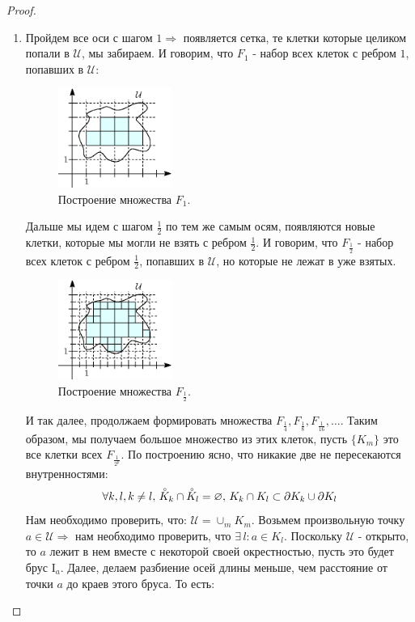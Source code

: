 \documentclass[12pt]{article}
\newcommand{\MI}{\mathrm{I}}
\newcommand{\MU}{\mathcal{U}}
\newcommand{\VN}{\varnothing}
\theoremstyle{definition}
\newcommand{\Circ}[1]{\accentset{\circ}{#1}}
\begin{document}
\begin{proof}\hfill
	\begin{enumerate}[label=\arabic*)]
		\item Пройдем все оси с шагом $1\Rightarrow$ появляется сетка, те клетки которые целиком попали в $\MU$, мы забираем. И говорим, что $F_1$ - набор всех клеток с ребром $1$, попавших в $\MU$:
		\begin{figure}[H]
			\centering
			\includegraphics[width=0.35\textwidth]{MA4L5_5.eps}
			\caption{Построение множества $F_1$.}
			\label{5_5}
		\end{figure}
		Дальше мы идем с шагом $\tfrac{1}{2}$ по тем же самым осям, появляются новые клетки, которые мы могли не взять с ребром $\tfrac{1}{2}$. И говорим, что $F_{\frac{1}{2}}$ - набор всех клеток с ребром $\tfrac{1}{2}$, попавших в $\MU$, но которые не лежат в уже взятых.
		\begin{figure}[H]
			\centering
			\includegraphics[width=0.35\textwidth]{MA4L5_6.eps}
			\caption{Построение множества $F_{\frac{1}{2}}$.}
			\label{5_6}
		\end{figure}
		И так далее, продолжаем формировать множества $F_{\frac{1}{4}}, F_{\frac{1}{8}}, F_{\frac{1}{16}}, \dotsc$. Таким образом, мы получаем большое множество из этих клеток, пусть $\{K_m\}$ это все клетки всех $F_{\frac{1}{2^p}}$. По построению ясно, что никакие две не пересекаются внутренностями:
		$$
			\forall k,l, k \neq l,\,  \Circ{K}_k \cap \Circ{K}_l = \VN, \, K_k \cap K_l \subset \partial K_k \cup \partial K_l 
		$$
		Нам необходимо проверить, что: $\MU = \cup_m K_m$. Возьмем произвольную точку $a \in \MU \Rightarrow$ нам необходимо проверить, что $\exists \, l \colon a \in K_l$. Поскольку $\MU$ - открыто, то $a$ лежит в нем вместе с некоторой своей окрестностью, пусть это будет брус $\MI_a$. Далее, делаем разбиение осей длины меньше, чем расстояние от точки $a$ до краев этого бруса. То есть:

\end{enumerate}
\end{proof}
\end{document}
